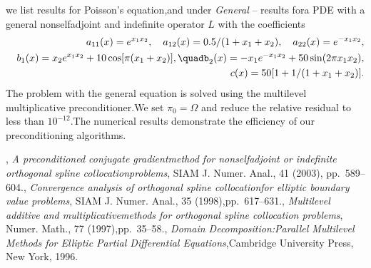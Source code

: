 \documentclass{report}
\begin{document}
we list results for Poisson's equation,and under \textit{General} -- results fora PDE with a general nonselfadjoint and indefinite operator $L$ with the coefficients\begin{eqnarray*}&&a_{11}(x)=e^{x_1x_2},\quad a_{12}(x)=0.5/(1+x_{1}+x_{2}),\quad a_{22}(x)=e^{-x_1x_2},\\&&b_{1}(x)=x_2e^{x_1x_2}+10\cos[\pi(x_1+x_2)],\quadb_{2}(x)=-x_1 e^{-x_1x_2}+50\sin (2\pi x_1x_2),\\&&c(x)=50[1+1/(1+x_1+x_2)].\end{eqnarray*}The problem with the general equation is solved using the multilevel multiplicative preconditioner.We set $\pi_0=\Omega$ and reduce the relative residual to less than $10^{-12}$.The numerical results demonstrate the efficiency of our preconditioning algorithms.\begin{thebibliography}{1},
{\em A preconditioned conjugate gradientmethod for nonselfadjoint or indefinite orthogonal spline collocationproblems},
SIAM J.
Numer.
Anal.,
41 (2003),
pp.~589--604.,
{\em Convergence analysis of orthogonal spline collocationfor elliptic boundary value problems},
SIAM J.
Numer.
Anal.,
35 (1998),pp.~617--631.,
{\em Multilevel additive and multiplicativemethods for orthogonal spline collocation problems},
Numer.
Math.,
77 (1997),pp.~35--58.,
{\em Domain Decomposition:Parallel Multilevel Methods for Elliptic Partial Differential Equations},Cambridge University Press,
New York,
1996.\end{thebibliography}
\end{document}
